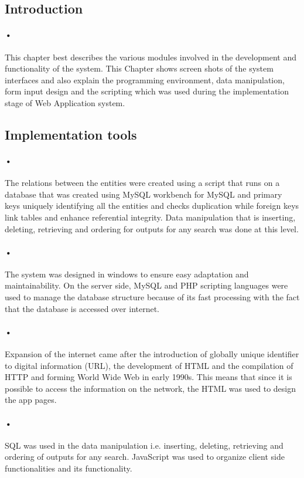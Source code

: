 \documentclass[12pt]{article}
\begin{document}
\subsection{Introduction} 
\paragraph{•}This chapter best describes the various modules involved in the development and functionality of the system. This Chapter shows screen shots of the system interfaces and also explain the programming environment, data manipulation, form input design and the scripting which was used during the implementation stage of Web Application system.

\subsection{Implementation tools} 
\paragraph{•}The relations between the entities were created using a script that runs on a database that was created using MySQL workbench for MySQL and primary keys uniquely identifying all the entities and checks duplication while foreign keys link tables and enhance referential integrity. Data manipulation that is inserting, deleting, retrieving and ordering for outputs for any search was done at this level.
\paragraph{•}The system was designed in windows to ensure easy adaptation and maintainability. On the server side, MySQL and PHP scripting languages were used to manage the database structure because of its fast processing with the fact that the database is accessed over internet.
\paragraph{•}Expansion of the internet came after the introduction of globally unique identifier to digital information (URL), the development of HTML and the compilation of HTTP and forming World Wide Web in early 1990s. This means that since it is possible to access the information on the network, the HTML was used to design the app pages.
\paragraph{•}SQL was used in the data manipulation i.e. inserting, deleting, retrieving and ordering of outputs for any search. 
JavaScript was used to organize client side functionalities and its functionality.
\end{document}
